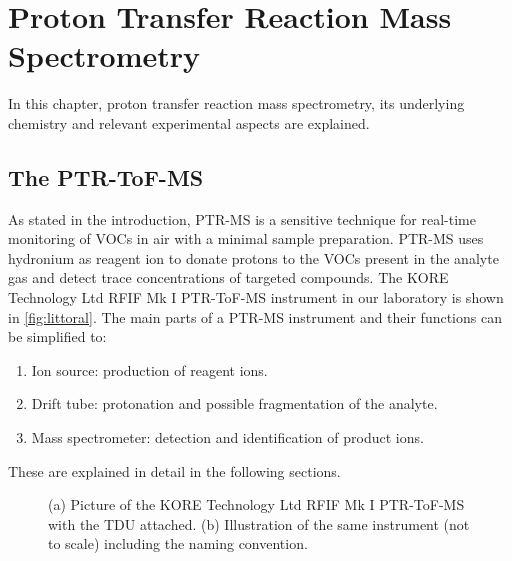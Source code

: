 \chapter{Proton Transfer Reaction Mass Spectrometry}\label{chapter:ptr}

In this chapter, proton transfer reaction mass spectrometry, %
 its underlying chemistry and relevant experimental aspects
are explained.





\section{The PTR-ToF-MS}
As stated in the introduction, PTR-MS is a sensitive technique for real-time monitoring of VOCs in air with a minimal sample preparation. PTR-MS uses hydronium as reagent ion to donate protons to the VOCs present in the analyte gas and detect trace concentrations of targeted compounds.  The KORE Technology Ltd RFIF Mk I PTR-ToF-MS instrument in our laboratory is shown in \autoref{fig:littoral}. 
The main  parts of a PTR-MS instrument and their functions can be simplified to:
\begin{enumerate}
    \item Ion source: production of reagent ions.
    \item Drift tube: protonation and possible fragmentation of the analyte.
    \item Mass spectrometer: detection and identification of product ions.
\end{enumerate}
  These are explained in detail in the following sections.

\begin{figure}%
\centering
{}

\bigskip
{}
\caption{(a) Picture of the KORE Technology Ltd RFIF Mk I PTR-ToF-MS  with the TDU attached.  (b) Illustration of the same instrument (not to scale) including the naming convention.}
\label{fig:littoral}
\end{figure}




